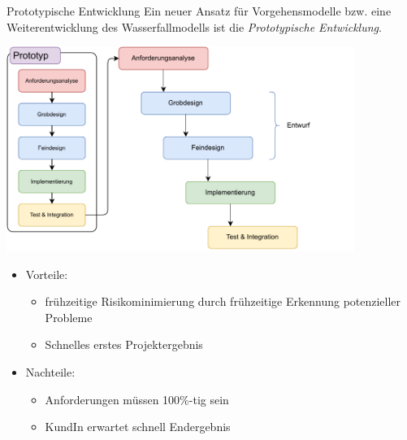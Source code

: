 \begin{defi}{Prototypische Entwicklung}
    Ein neuer Ansatz für Vorgehensmodelle bzw. eine Weiterentwicklung des Wasserfallmodells ist die \emph{Prototypische Entwicklung}.

    \begin{center}
        \includegraphics[width=0.85\textwidth]{includes/figures/defi_prototype_development.pdf}
    \end{center}

    \begin{itemize}
        \item Vorteile:
              \begin{itemize}
                  \item frühzeitige Risikominimierung durch frühzeitige Erkennung potenzieller Probleme
                  \item Schnelles erstes Projektergebnis
              \end{itemize}
        \item Nachteile:
              \begin{itemize}
                  \item Anforderungen müssen 100\%-tig sein
                  \item KundIn erwartet schnell Endergebnis
              \end{itemize}
    \end{itemize}
\end{defi}

